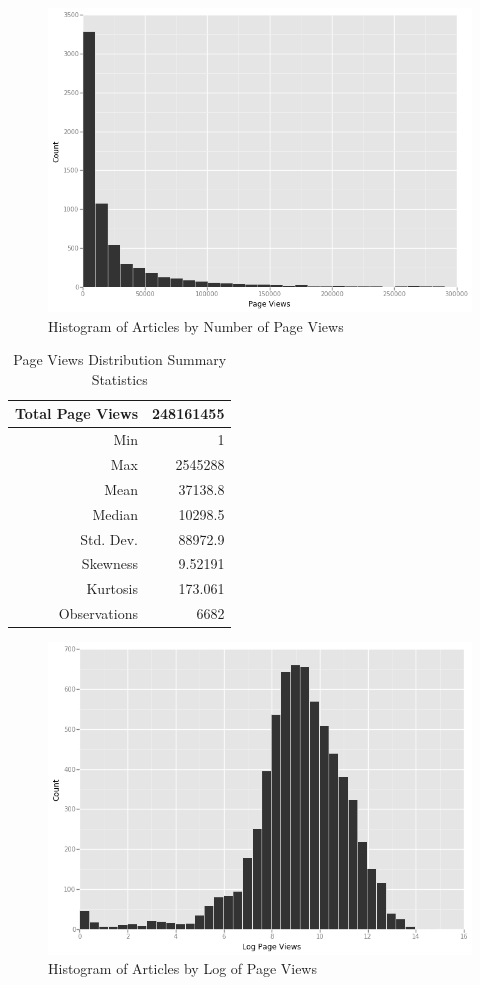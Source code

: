 \documentclass[fleqn,12pt]{SelfArx} %
\begin{document}
\begin{figure}[ht]\centering
\includegraphics[width=\linewidth]{pageviews_hist}
\caption{Histogram of Articles by Number of Page Views}
\label{fig:pv_hist}
\end{figure}
\begin{table}[hbt]
\caption{Page Views Distribution Summary Statistics}
\centering
\begin{tabular}{rr}
\toprule
Total Page Views  &  248161455\\
\midrule
Min               &  1\\
Max               &  2545288\\  
Mean              &  37138.8\\
Median            &  10298.5\\
Std. Dev.         &  88972.9\\
Skewness          &  9.52191\\
Kurtosis          &  173.061\\
\midrule
Observations &  6682\\
\bottomrule
\end{tabular}
\end{table}

\begin{figure}[ht]\centering
\includegraphics[width=\linewidth]{log_pageviews_hist}
\caption{Histogram of Articles by Log of Page Views}
\label{fig:lpv_hist}
\end{figure}
\end{document}
